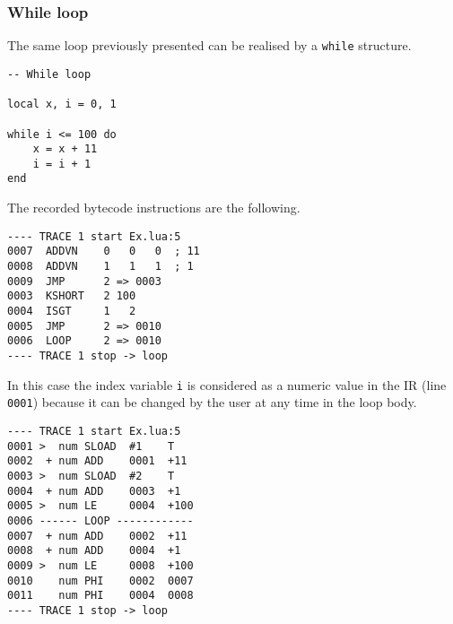 \subsubsection{While loop}
The same loop previously presented can be realised by a \texttt{while} structure. 
\begin{mdframed}[style=LuaStyleFrame]
\begin{lstlisting}[style=LuaStyle]
-- While loop

local x, i = 0, 1

while i <= 100 do
	x = x + 11
	i = i + 1
end
\end{lstlisting}
\end{mdframed}
\noindent The recorded bytecode instructions are the following.
\begin{multicols}{2}
\begin{lstlisting}[style=DumpStyle]
---- TRACE 1 start Ex.lua:5
0007  ADDVN    0   0   0  ; 11
0008  ADDVN    1   1   1  ; 1
0009  JMP      2 => 0003
0003  KSHORT   2 100
0004  ISGT     1   2
0005  JMP      2 => 0010
0006  LOOP     2 => 0010
---- TRACE 1 stop -> loop
\end{lstlisting}
\end{multicols}
\noindent In this case the index variable \texttt{i} is considered as a numeric value in the IR (line \texttt{0001}) because it can be changed by the user at any time in the loop body.
\begin{multicols}{2}
\begin{lstlisting}[style=DumpStyle]
---- TRACE 1 start Ex.lua:5
0001 >  num SLOAD  #1    T
0002  + num ADD    0001  +11 
0003 >  num SLOAD  #2    T
0004  + num ADD    0003  +1  
0005 >  num LE     0004  +100
0006 ------ LOOP ------------
0007  + num ADD    0002  +11 
0008  + num ADD    0004  +1  
0009 >  num LE     0008  +100
0010    num PHI    0002  0007
0011    num PHI    0004  0008
---- TRACE 1 stop -> loop
\end{lstlisting}
\end{multicols}

